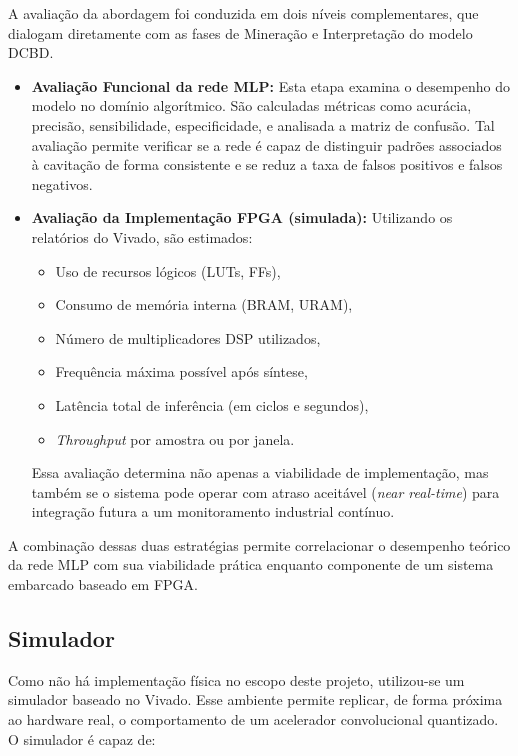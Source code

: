 A avaliação da abordagem foi conduzida em dois níveis complementares, que 
dialogam diretamente com as fases de Mineração e Interpretação do modelo DCBD.

\begin{itemize}
	\item \textbf{Avaliação Funcional da rede MLP:}  
	Esta etapa examina o desempenho do modelo no domínio algorítmico.  
	São calculadas métricas como acurácia, precisão, sensibilidade, 
	especificidade, e analisada a matriz de confusão.  
	Tal avaliação permite verificar se a rede é capaz de distinguir padrões 
	associados à cavitação de forma consistente e se reduz a taxa de falsos 
	positivos e falsos negativos.
	
	\item \textbf{Avaliação da Implementação FPGA (simulada):}  
	Utilizando os relatórios do Vivado, são estimados:  
	\begin{itemize}
		\item Uso de recursos lógicos (LUTs, FFs),  
		\item Consumo de memória interna (BRAM, URAM),  
		\item Número de multiplicadores DSP utilizados,  
		\item Frequência máxima possível após síntese,  
		\item Latência total de inferência (em ciclos e segundos),  
		\item \textit{Throughput} por amostra ou por janela.  
	\end{itemize}
	Essa avaliação determina não apenas a viabilidade de implementação, mas 
	também se o sistema pode operar com atraso aceitável (\textit{near real-time}) 
	para integração futura a um monitoramento industrial contínuo.
\end{itemize}

A combinação dessas duas estratégias permite correlacionar o desempenho teórico 
da rede MLP com sua viabilidade prática enquanto componente de um sistema 
embarcado baseado em FPGA.


\subsection{Simulador}

Como não há implementação física no escopo deste projeto, utilizou-se um 
simulador baseado no Vivado. Esse ambiente permite 
replicar, de forma próxima ao hardware real, o comportamento de um acelerador 
convolucional quantizado. O simulador é capaz de:

